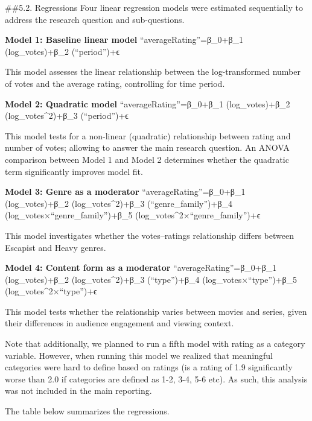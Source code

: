 \documentclass[
  11pt,
]{article}
\begin{document}
\#\#5.2. Regressions Four linear regression models were estimated
sequentially to address the research question and sub-questions.

\textbf{Model 1: Baseline linear model} ``averageRating''=β\_0+β\_1
(log⁡\_votes)+β\_2 (``period'')+ϵ

This model assesses the linear relationship between the log-transformed
number of votes and the average rating, controlling for time period.

\textbf{Model 2: Quadratic model} ``averageRating''=β\_0+β\_1
(log⁡\_votes)+β\_2 (log⁡\_votes\^{}2)+β\_3 (``period'')+ϵ

This model tests for a non-linear (quadratic) relationship between
rating and number of votes; allowing to answer the main research
question. An ANOVA comparison between Model 1 and Model 2 determines
whether the quadratic term significantly improves model fit.

\textbf{Model 3: Genre as a moderator} ``averageRating''=β\_0+β\_1
(log⁡\_votes)+β\_2 (log⁡\_votes\^{}2)+β\_3 (``genre\_family'')+β\_4
(log⁡\_votes×``genre\_family'')+β\_5
(log⁡\_votes\^{}2×``genre\_family'')+ϵ

This model investigates whether the votes--ratings relationship differs
between Escapist and Heavy genres.

\textbf{Model 4: Content form as a moderator}
``averageRating''=β\_0+β\_1 (log⁡\_votes)+β\_2 (log⁡\_votes\^{}2)+β\_3
(``type'')+β\_4 (log⁡\_votes×``type'')+β\_5 (log⁡\_votes\^{}2×``type'')+ϵ

This model tests whether the relationship varies between movies and
series, given their differences in audience engagement and viewing
context.

Note that additionally, we planned to run a fifth model with rating as a
category variable. However, when running this model we realized that
meaningful categories were hard to define based on ratings (is a rating
of 1.9 significantly worse than 2.0 if categories are defined as 1-2,
3-4, 5-6 etc). As such, this analysis was not included in the main
reporting.

The table below summarizes the regressions.
\end{document}
